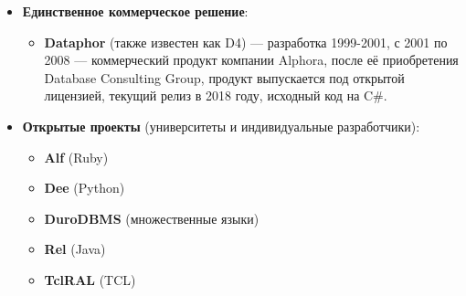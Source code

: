 \documentclass[a4paper,12pt]{article}
\begin{document}
\begin{itemize}
    \item \textbf{Единственное коммерческое решение}:
    \begin{itemize}
        \item \textbf{Dataphor} (также известен как D4) --- разработка 1999-2001, с 2001 по 2008 --- коммерческий продукт компании Alphora, после её приобретения Database Consulting Group, продукт выпускается под открытой лицензией, текущий релиз в 2018 году, исходный код на C\#.
    \end{itemize}
    
    \item \textbf{Открытые проекты} (университеты и индивидуальные разработчики):
    \begin{itemize}
        \item \textbf{Alf} (Ruby)
        \item \textbf{Dee} (Python)
        \item \textbf{DuroDBMS} (множественные языки)
        \item \textbf{Rel} (Java)
        \item \textbf{TclRAL} (TCL)
    \end{itemize}
\end{itemize}
\end{document}
